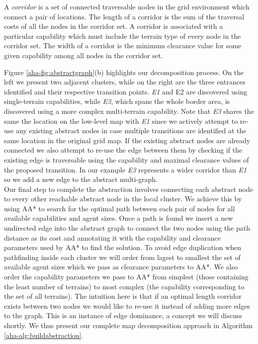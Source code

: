 \begin{definition}
A \emph{corridor} is a set of connected traversable nodes in the grid environment which connect a pair of locations. The length of a corridor is the sum of the traversal costs of all the nodes in the corridor set. A corridor is associated with a particular capability which must include the terrain type of every node in the corridor set. 
The width of a corridor is the minimum clearance value for some given capability among all nodes in the corridor set. 
\end{definition}

Figure \ref{aha-fig:abstractgraph}(b) highlights our decomposition process. On the left we present two adjacent clusters, while on the right are the three entrances identified and their respective transition points. \emph{E1} and {E2} are discovered using single-terrain capabilities, while \emph{E3}, which spans the whole border area, is discovered using a more complex multi-terrain capability. 
Note that \emph{E3} shares the same the location on the low-level map with \emph{E1} since we actively attempt to re-use any existing abstract nodes in case multiple transitions are identified at the same location in the original grid map. If the existing abstract nodes are already connected we also attempt to re-use the edge between them by checking if the existing edge is traversable using the capability and maximal clearance values of the proposed transition. In our example \emph{E3} represents a wider corridor than \emph{E1} so we add a new edge to the abstract multi-graph. \\
\medskip
Our final step to complete the abstraction involves connecting each abstract node to every other reachable abstract node in the local cluster. 
We achieve this by using AA* to search for the optimal path between each pair of nodes for all available capabilities and agent sizes. 
Once a path is found we insert a new undirected edge into the abstract graph to connect the two nodes using the path distance as its cost and annotating it with the capability and clearance parameters used by AA* to find the solution. 
To avoid edge duplication when pathfinding inside each  cluster we will order from lagest to smallest the set of available agent sizes which we pass as clearance parameters to AA*. 
We also order the capability parameters we pass to AA* from simplest (those containing the least number of terrains) to most complex (the capability corresponding to the set of all terrains). 
The intuition here is that if an optimal length corridor exists between two nodes we would like to re-use it instead of adding more edges to the graph. This is an instance of edge dominance, a concept we will discuss shortly.
We thus present our complete map decomposition approach in  Algorithm \ref{aha-alg:buildabstraction}.

